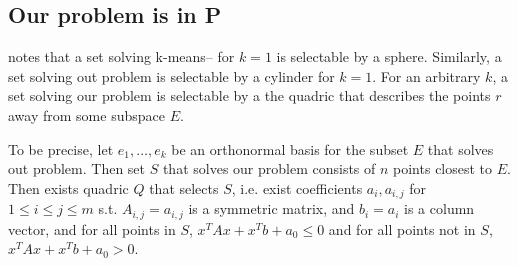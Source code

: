 \documentclass{article}
\begin{document}
\subsection{Our problem is in \textbf{P}}
\cite{chawla2013k} notes that a set solving k-means-- for $k=1$ is selectable by a sphere. Similarly, a set solving out problem is selectable by a cylinder for $k=1$. For an arbitrary $k$, a set solving our problem is selectable by a the quadric that describes the points $r$ away from some subspace $E$.

To be precise, let $e_1,\dots,e_k$ be an orthonormal basis for the subset $E$ that solves out problem. Then set $S$ that solves our problem consists of $n$ points closest to $E$. Then exists quadric $Q$ that selects $S$, i.e. exist coefficients $a_i, a_{i,j}$ for $1\leq i\leq j\leq m$ s.t. $A_{i,j} = a_{i,j}$ is a symmetric matrix, and $b_i = a_i$ is a column vector, and for all points in $S$, $x^TAx + x^Tb + a_0 \leq 0$ and for all points not in $S$, $x^TAx + x^Tb + a_0 > 0$.
\end{document}
